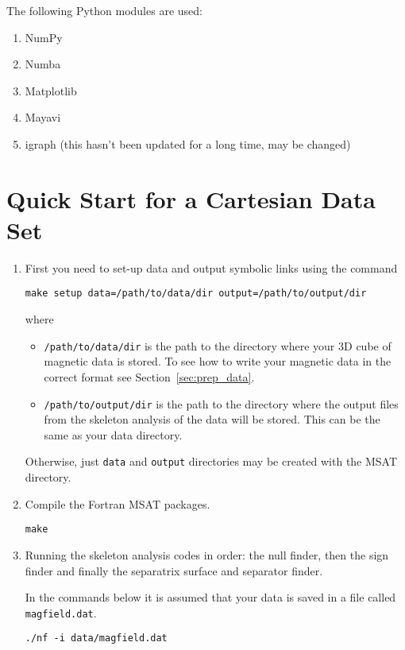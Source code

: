\documentclass[12pt]{article}
\begin{document}
    The following Python modules are used:
    \begin{enumerate}
      \item NumPy
      \item Numba
      \item Matplotlib
      \item Mayavi
      \item igraph (this hasn't been updated for a long time, may be changed)
    \end{enumerate}

  \section{Quick Start for a Cartesian Data Set}

    \begin{enumerate}
      \item First you need to set-up data and output symbolic links using the command
      
      \texttt{make setup data=/path/to/data/dir output=/path/to/output/dir}
      
      where
      \begin{itemize}
        \item \texttt{/path/to/data/dir} is the path to the directory where your 3D cube of magnetic data is stored. To see how to write your magnetic data in the correct format see Section~\ref{sec:prep_data}. 

        \item \texttt{/path/to/output/dir} is the path to the directory where the output files from the skeleton analysis of the data will be stored. This can be the same as your data directory.
      \end{itemize}

      Otherwise, just \texttt{data} and \texttt{output} directories may be created with the MSAT directory.

      \item Compile the Fortran MSAT packages.

      \texttt{make}

      \item Running the skeleton analysis codes in order: the null finder, then the sign finder and finally the separatrix surface and separator finder.

      In the commands below it is assumed that your data is saved in a file called \texttt{magfield.dat}.

      \texttt{./nf -i data/magfield.dat}


\end{enumerate}
\end{document}
